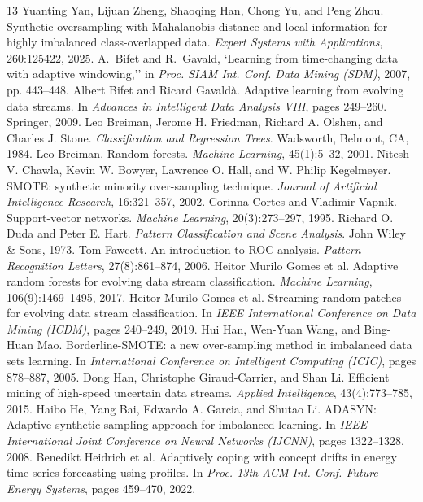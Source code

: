 \documentclass[preprint,10pt]{elsarticle}
\begin{document}
\begin{thebibliography}{13}
 Yuanting Yan, Lijuan Zheng, Shaoqing Han, Chong Yu, and Peng Zhou. Synthetic oversampling with Mahalanobis distance and local information for highly imbalanced class-overlapped data. \emph{Expert Systems with Applications}, 260:125422, 2025.
A.~Bifet and R.~Gavald{\}, `Learning from time-changing data with adaptive windowing,'' in \emph{Proc. SIAM Int. Conf. Data Mining (SDM)}, 2007, pp. 443--448.
 Albert Bifet and Ricard Gavald\`a. Adaptive learning from evolving data streams. In \emph{Advances in Intelligent Data Analysis VIII}, pages 249--260. Springer, 2009.
 Leo Breiman, Jerome H. Friedman, Richard A. Olshen, and Charles J. Stone. \emph{Classification and Regression Trees}. Wadsworth, Belmont, CA, 1984.
 Leo Breiman. Random forests. \emph{Machine Learning}, 45(1):5--32, 2001.
 Nitesh V. Chawla, Kevin W. Bowyer, Lawrence O. Hall, and W. Philip Kegelmeyer. SMOTE: synthetic minority over-sampling technique. \emph{Journal of Artificial Intelligence Research}, 16:321--357, 2002.
 Corinna Cortes and Vladimir Vapnik. Support-vector networks. \emph{Machine Learning}, 20(3):273--297, 1995.
 Richard O. Duda and Peter E. Hart. \emph{Pattern Classification and Scene Analysis}. John Wiley \& Sons, 1973.
 Tom Fawcett. An introduction to ROC analysis. \emph{Pattern Recognition Letters}, 27(8):861--874, 2006.
 Heitor Murilo Gomes et al. Adaptive random forests for evolving data stream classification. \emph{Machine Learning}, 106(9):1469--1495, 2017.
 Heitor Murilo Gomes et al. Streaming random patches for evolving data stream classification. In \emph{IEEE International Conference on Data Mining (ICDM)}, pages 240--249, 2019.
 Hui Han, Wen-Yuan Wang, and Bing-Huan Mao. Borderline-SMOTE: a new over-sampling method in imbalanced data sets learning. In \emph{International Conference on Intelligent Computing (ICIC)}, pages 878--887, 2005.
 Dong Han, Christophe Giraud-Carrier, and Shan Li. Efficient mining of high-speed uncertain data streams. \emph{Applied Intelligence}, 43(4):773--785, 2015.
 Haibo He, Yang Bai, Edwardo A. Garcia, and Shutao Li. ADASYN: Adaptive synthetic sampling approach for imbalanced learning. In \emph{IEEE International Joint Conference on Neural Networks (IJCNN)}, pages 1322--1328, 2008.
 Benedikt Heidrich et al. Adaptively coping with concept drifts in energy time series forecasting using profiles. In \emph{Proc. 13th ACM Int. Conf. Future Energy Systems}, pages 459--470, 2022.

\end{thebibliography}
\end{document}
